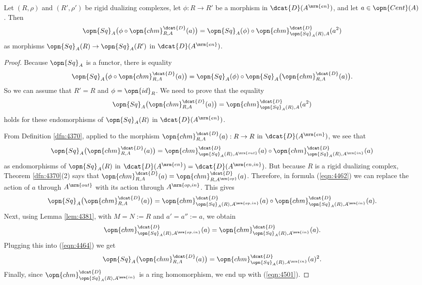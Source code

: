 \begin{lem} \label{lem:4384}
Let $(R, \rho)$ and $(R', \rho')$ be rigid dualizing complexes, 
let $\phi : R \to R'$ be a morphism in $\dcat{D}(A^{\mrm{en}})$, and let
$a \in \opn{Cent}(A)$. Then 
\[ \opn{Sq}_{A} \bigl( \phi \circ \opn{chm}^{\dcat{D}}_{R, A}(a) \bigr) = 
\opn{Sq}_{A}(\phi) \circ \opn{chm}^{\dcat{D}}_{\opn{Sq}_{A}(R), A}(a^2) \]
as morphisms $\opn{Sq}_{A}(R) \to \opn{Sq}_{A}(R')$ in 
$\dcat{D}(A^{\mrm{en}})$.
\end{lem}

\begin{proof}
Because $\opn{Sq}_{A}$ is a functor, there is equality 
\[ \opn{Sq}_{A} \bigl( \phi \circ \opn{chm}^{\dcat{D}}_{R, A}(a) \bigr) =
\opn{Sq}_{A}(\phi) \circ 
\opn{Sq}_{A} \bigl( \opn{chm}^{\dcat{D}}_{R, A}(a) \bigr) .  \]
So we can assume that $R' = R$ and 
$\phi = \opn{id}_R$. We need to prove that the equality 
\begin{equation} \label{eqn:4501}
\opn{Sq}_{A} \bigl( \opn{chm}^{\dcat{D}}_{R, A}(a) \bigr) = 
\opn{chm}^{\dcat{D}}_{\opn{Sq}_{A}(R), A}(a^2) 
\end{equation}
holds for these endomorphisms of $\opn{Sq}_{A}(R)$ in $\dcat{D}(A^{\mrm{en}})$.

From Definition \ref{dfn:4370}, applied to the morphism 
$\opn{chm}^{\dcat{D}}_{R, A}(a) : R \to R$ 
in $\dcat{D}(A^{\mrm{en}})$, we see that 
\begin{equation} \label{eqn:4462}
\opn{Sq}_{A} \bigl( \opn{chm}^{\dcat{D}}_{R, A}(a) \bigr) = 
\opn{chm}^{\dcat{D}}_{\opn{Sq}_{A}(R), A^{\mrm{out}}}(a) \circ 
\opn{chm}^{\dcat{D}}_{\opn{Sq}_{A}(R), A^{\mrm{in}}}(a) 
\end{equation}
as endomorphisms of $\opn{Sq}_{A}(R)$ in 
$\dcat{D}(A^{\mrm{en}}) = \dcat{D}(A^{\mrm{en, in}})$.
But because $R$ is a rigid dualizing complex,  Theorem \ref{dfn:4370}(2) 
says that 
$\opn{chm}^{\dcat{D}}_{R, A}(a) = \opn{chm}^{\dcat{D}}_{R, A^{\mrm{op}}}(a)$.
Therefore, in formula (\ref{eqn:4462}) we can replace the action of $a$ 
through $A^{\mrm{out}}$ with its action through $A^{\mrm{op, in}}$. This gives 
\begin{equation} \label{eqn:4464}
\opn{Sq}_{A} \bigl( \opn{chm}^{\dcat{D}}_{R, A}(a) \bigr) = 
\opn{chm}^{\dcat{D}}_{\opn{Sq}_{A}(R), A^{\mrm{op, in}}}(a) \circ 
\opn{chm}^{\dcat{D}}_{\opn{Sq}_{A}(R), A^{\mrm{in}}}(a) . 
\end{equation}
Next, using Lemma \ref{lem:4381}, with $M = N := R$ and $a' = a'' := a$, 
we obtain 
\[ \opn{chm}^{\dcat{D}}_{\opn{Sq}_{A}(R), A^{\mrm{op, in}}}(a) =
\opn{chm}^{\dcat{D}}_{\opn{Sq}_{A}(R), A^{\mrm{in}}}(a) . \]
Plugging this into (\ref{eqn:4464}) we get 
\[ \opn{Sq}_{A} \bigl( \opn{chm}^{\dcat{D}}_{R, A}(a) \bigr) = 
\opn{chm}^{\dcat{D}}_{\opn{Sq}_{A}(R), A^{\mrm{in}}}(a)^2 . \]
Finally, since 
$\opn{chm}^{\dcat{D}}_{\opn{Sq}_{A}(R), A^{\mrm{in}}}$ 
is a ring homomorphism, we end up with (\ref{eqn:4501}). 
\end{proof}

